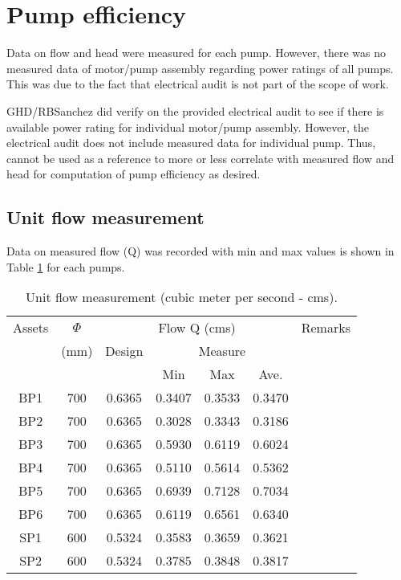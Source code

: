 
\section{Pump efficiency} \label{ch04mech03}
Data on flow and head were measured for each pump. However, there was no measured data of motor/pump assembly regarding power ratings of all pumps. This was due to the fact that electrical audit is not part of the scope of work.

GHD/RBSanchez did verify on the provided electrical audit to see if there is available power rating for individual motor/pump assembly. However, the electrical audit does not include measured data for individual pump. Thus, cannot be used as a reference to more or less correlate with measured flow and head for computation of pump efficiency as desired.

\subsection{Unit flow measurement} \label{ch04mech04}
Data on measured flow (Q) was recorded with min and max values is shown in Table \ref{ch04_tbl_flow01} for each pumps. %

\begin{table}[!h]
	\caption{Unit flow measurement (cubic meter per second - cms).}
	\label{ch04_tbl_flow01}
	{\footnotesize
\begin{tabular}{c|c|c|c|c|c|l}
	\hline
	Assets & $\Phi$  & \multicolumn{4}{c|}{Flow Q (cms)} & Remarks \\ 
	\cline{3-6}
	& (mm) & Design & \multicolumn{3}{c|}{Measure} &  \\ 
	\cline{4-6}
	&  &  & Min & Max & Ave. &  \\ 
	\hline
	BP1 & 700 & 0.6365 & 0.3407 & 0.3533 & 0.3470  &  \\ 
	BP2 & 700 & 0.6365 & 0.3028 & 0.3343 & 0.3186  &  \\ 
	BP3 & 700 & 0.6365 & 0.5930 & 0.6119 & 0.6024  &  \\ 
	BP4 & 700 & 0.6365 & 0.5110 & 0.5614 & 0.5362  &  \\ 
	BP5 & 700 & 0.6365 & 0.6939 & 0.7128 & 0.7034  &  \\ 
	BP6 & 700 & 0.6365 & 0.6119 & 0.6561 & 0.6340  &  \\ 
	SP1 & 600 & 0.5324 & 0.3583 & 0.3659 & 0.3621  &  \\ 
	SP2 & 600 & 0.5324 & 0.3785 & 0.3848 & 0.3817  &  \\ 
	\hline
\end{tabular}
	}
\end{table}

